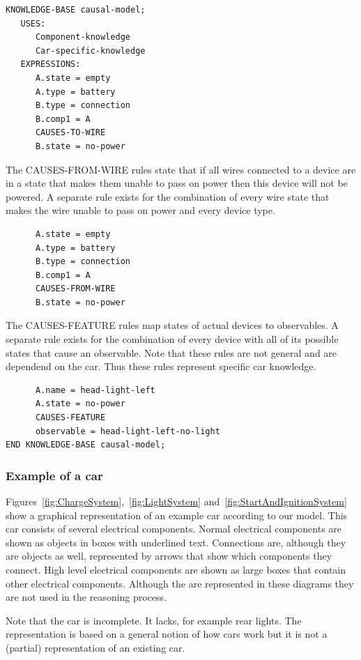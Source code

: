 \documentclass[a4paper,10pt]{article}
\begin{document}
\begin{verbatim}
KNOWLEDGE-BASE causal-model;
   USES:
      Component-knowledge
      Car-specific-knowledge
   EXPRESSIONS:
      A.state = empty
      A.type = battery
      B.type = connection
      B.comp1 = A
      CAUSES-TO-WIRE
      B.state = no-power
\end{verbatim}

\noindent
The CAUSES-FROM-WIRE rules state that if all wires connected to a device are in a state that makes them unable to pass on power then this device will not be powered. A separate rule exists for the combination of every wire state that makes the wire unable to pass on power and every device type.

\begin{verbatim}
      A.state = empty
      A.type = battery
      B.type = connection
      B.comp1 = A
      CAUSES-FROM-WIRE
      B.state = no-power
\end{verbatim}

\noindent
The CAUSES-FEATURE rules map states of actual devices to observables. A separate rule exists for the combination of every device with all of its possible states that cause an observable. Note that these rules are not general and are dependend on the car. Thus these rules represent specific car knowledge.

\begin{verbatim}
      A.name = head-light-left
      A.state = no-power
      CAUSES-FEATURE
      observable = head-light-left-no-light
END KNOWLEDGE-BASE causal-model;
\end{verbatim}


\subsubsection{Example of a car}
Figures~\ref{fig:ChargeSystem},~\ref{fig:LightSystem} and~\ref{fig:StartAndIgnitionSystem} show a graphical representation of an example car according to our model. This car consists of several electrical components. Normal electrical components are shown as objects in boxes with underlined text. Connections are, although they are objects as well, represented by arrows that show which components they connect. High level electrical components are shown as large boxes that contain other electrical components. Although the are represented in these diagrams they are not used in the reasoning process.

Note that the car is incomplete. It lacks, for example rear lights. The representation is based on a general notion of how cars work but it is not a (partial) representation of an existing car.
\end{document}
